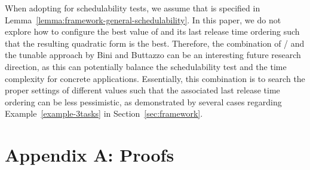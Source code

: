 \documentclass[10pt,conference]{IEEEtran}
\newcommand{\frameworkkq}[1]{}
\newcommand{\frameworkku}[1]{}
\begin{document}
When adopting \frameworkkq{} for schedulability tests, we assume that
 is specified in
Lemma~\ref{lemma:framework-general-schedulability}. In this paper, we
do not explore how to configure the best value of  and its last
release time ordering  such that the resulting quadratic form is
the best. Therefore, the combination of \frameworkkq{}/\frameworkku{}
and the tunable approach by Bini and Buttazzo
\cite{DBLP:journals/tc/BiniB04} can be an interesting future research
direction, as this can potentially balance the schedulability test and
the time complexity for concrete applications. Essentially, this
combination is to search the proper settings of different  values
such that the associated last release time ordering  can be 
less pessimistic, as demonstrated by several cases regarding Example~\ref{example-3tasks} in Section~\ref{sec:framework}.

 \begin{spacing}{0.9}
 \end{spacing}

\footnotesize
\vspace{-0.1in}
\begin{spacing}{0.98}
\def\IEEEbibitemsep{-1pt}


\end{spacing}
\normalsize

\section*{Appendix A: Proofs}
\end{document}
